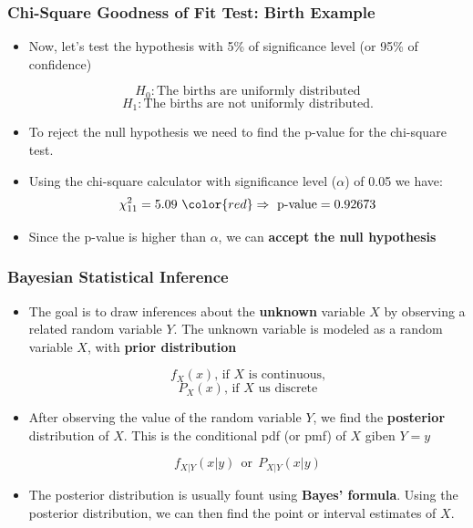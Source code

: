 \begin{frame}
    \frametitle{Chi-Square Goodness of Fit Test: Birth Example}


    \begin{itemize}
        \item Now, let's test the hypothesis with 5\% of significance level (or 95\% of confidence)

        $$H_0: \text{The births are uniformly distributed}$$
        $$H_1: \text{The births are not uniformly distributed.}$$

        \item To reject the null hypothesis we need to find the p-value for the chi-square test.

        \item Using the chi-square calculator with significance level ($\alpha$) of 0.05 we have:
        $$\chi^{2}_{11} = 5.09~{\color{red}\Rightarrow~\text{p-value} = 0.92673}$$

        \item Since the p-value is higher than $\alpha$, we can \textbf{accept the null hypothesis}



    \end{itemize}
   


\end{frame}






\begin{frame}
    \frametitle{Bayesian Statistical Inference}


    \begin{itemize}
        \item The goal is to draw inferences about the \textbf{unknown} variable $X$
        by observing a related random variable $Y$. The unknown variable is modeled as a random
        variable $X$, with \textbf{prior distribution}

        $$f_X(x)\text{, if $X$ is continuous,}$$
        $$P_X(x)\text{, if $X$ us discrete}$$

        \item After observing the value of the random variable $Y$, we find the
        \textbf{posterior} distribution of $X$. This is the conditional pdf (or pmf) of $X$ giben $Y=y$

        $$f_{X|Y}(x|y)~~\text{or}~~P_{X|Y}(x|y)$$

        \item The posterior distribution is usually fount using \textbf{Bayes' formula}. Using the posterior
        distribution, we can then find the point or interval estimates of $X$.

    \end{itemize}

\end{frame}


